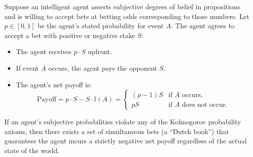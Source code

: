 Suppose an intelligent agent asserts subjective degrees of belief in propositions and is willing to accept bets at betting odds corresponding to those numbers. Let $p \in [0, 1]$ be the agent's stated probability for event $A$. The agent agrees to accept a bet with positive or negative stake $S$:
\begin{itemize}[noitemsep]
  \item The agent receives $p \cdot S$ upfront.
  \item If event $A$ occurs, the agent pays the opponent $S$.
  \item The agent's net payoff is:
  \begin{equation}
  \text{Payoff} = p \cdot S - S \cdot \mathbb{I}(A) = \begin{cases} (p - 1)S & \text{if } A \text{ occurs}, \\ p S & \text{if } A \text{ does not occur}. \end{cases}
  \end{equation}
\end{itemize}

\begin{theorem}
If an agent's subjective probabilities violate any of the Kolmogorov probability axioms, then there exists a set of simultaneous bets (a ``Dutch book'') that guarantees the agent incurs a strictly negative net payoff regardless of the actual state of the world.
\end{theorem}

